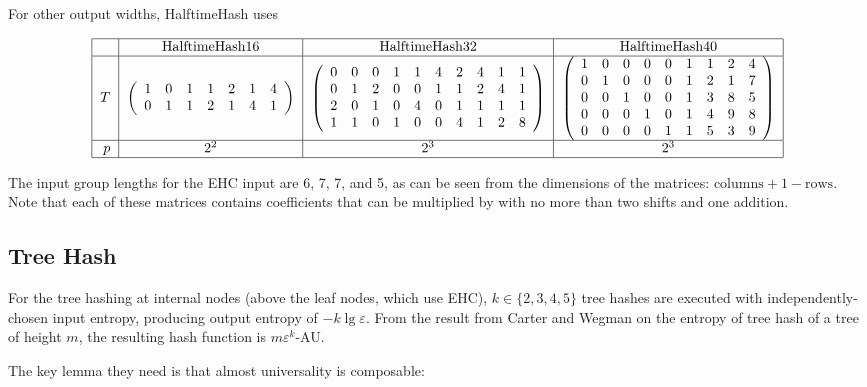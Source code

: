 \documentclass[runningheads]{llncs}
\begin{document}
For other output widths, HalftimeHash uses

\[
\begin{tabular}{|r|c|c|c|}
  \hline  & HalftimeHash16 & HalftimeHash32 & HalftimeHash40 \\
  \hline $T$ &
$\left(
\begin{array}{rrrrrrrrrrrr}
  1 & 0 & 1 & 1 & 2 & 1 & 4\\
  0 & 1 & 1 & 2 & 1 & 4 & 1
\end{array}
\right)$
&
$\left(
\begin{array}{rrrrrrrrrr}
 0 & 0 & 0 & 1 & 1 & 4 & 2 & 4 & 1 & 1 \\
 0 & 1 & 2 & 0 & 0 & 1 & 1 & 2 & 4 & 1 \\
 2 & 0 & 1 & 0 & 4 & 0 & 1 & 1 & 1 & 1 \\
 1 & 1 & 0 & 1 & 0 & 0 & 4 & 1 & 2 & 8
\end{array}
\right)$
&
$\left(
\begin{array}{rrrrrrrrr}
 1 & 0 & 0 & 0 & 0 & 1 & 1 & 2 & 4\\
 0 & 1 & 0 & 0 & 0 & 1 & 2 & 1 & 7\\
 0 & 0 & 1 & 0 & 0 & 1 & 3 & 8 & 5\\
 0 & 0 & 0 & 1 & 0 & 1 & 4 & 9 & 8\\
 0 & 0 & 0 & 0 & 1 & 1 & 5 & 3 & 9
\end{array}
\right)$ \\
\hline $p$ & $2^2$ & $2^3$ & $2^3$ \\
\hline
\end{tabular}
\]

The input group lengths for the EHC input are 6, 7, 7, and 5, as can be seen from the dimensions of the matrices: $\text{columns} + 1 - \text{rows}$.
Note that each of these matrices contains coefficients that can be multiplied by with no more than two shifts and one addition.

\subsection{Tree Hash}

For the tree hashing at internal nodes (above the leaf nodes, which use EHC), $k \in \{2, 3, 4, 5\}$ tree hashes are executed with independently-chosen input entropy, producing output entropy of $-k \lg \varepsilon$.
From the result from Carter and Wegman on the entropy of tree hash of a tree of height $m$, the resulting hash function is $m\varepsilon^k$-AU.

The key lemma they need is that almost universality is composable:
\end{document}

